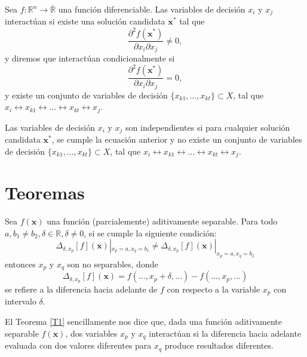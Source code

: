\begin{definicion}
\label{D5}
Sea \( f : \mathbb{R}^n \to \overline{\mathbb{R}} \) una función diferenciable. Las variables de decisión \( x_i \) y \( x_j \) interactúan si existe una solución candidata \( \mathbf{x}^* \) tal que
\begin{equation}
\frac{\partial^2 f(\mathbf{x}^*)}{\partial x_i \partial x_j} \neq 0,
\label{EQ4}
\end{equation}
y diremos que interactúan condicionalmente si 
\begin{equation}
\frac{\partial^2 f(\mathbf{x}^*)}{\partial x_i \partial x_j} = 0,
\label{EQ5}
\end{equation}
y existe un conjunto de variables de decisión \(\{x_{k1}, \ldots, x_{kt}\} \subset X\), tal que \( x_i \leftrightarrow x_{k1} \leftrightarrow \ldots \leftrightarrow x_{kt} \leftrightarrow x_j \). 

Las variables de decisión \( x_i \) y \( x_j \) son independientes si para cualquier solución candidata \( \mathbf{x}^* \), se cumple la ecuación anterior y no existe un conjunto de variables de decisión \(\{x_{k1}, \ldots, x_{kt}\} \subset X\), tal que \( x_i \leftrightarrow x_{k1} \leftrightarrow \ldots \leftrightarrow x_{kt} \leftrightarrow x_j \).
\end{definicion}

\section{Teoremas}

\begin{teorema}
\label{T1}
Sea \( f(\mathbf{x}) \) una función (parcialemente) aditivamente separable. Para todo \( a, b_1 \neq b_2, \delta \in \mathbb{R}, \delta \neq 0 \), si se cumple la siguiente condición:
\begin{equation}
\Delta_{\delta,x_p}[f](\mathbf{x})|_{x_p=a, x_q=b_1} \neq \Delta_{\delta,x_p}[f](\mathbf{x})|_{x_p=a, x_q=b_2}
\label{EQ6}
\end{equation}
entonces \( x_p \) y \( x_q \) son no separables, donde
\begin{equation}
\Delta_{\delta,x_p}[f](\mathbf{x}) = f(\ldots, x_p + \delta, \ldots) - f(\ldots, x_p, \ldots)
\label{EQ7}
\end{equation}
se refiere a la diferencia hacia adelante de \( f \) con respecto a la variable \( x_p \) con intervalo \( \delta \).
\end{teorema}

El Teorema \ref{T1} sencillamente nos dice que, dada una función aditivamente separable \( f(\mathbf{x}) \), dos variables \( x_p \) y \( x_q \) interactúan si la diferencia hacia adelante evaluada con dos valores diferentes para \( x_q \) produce resultados diferentes.


